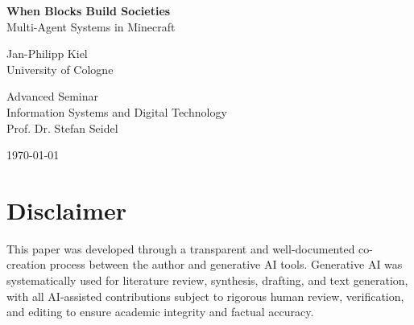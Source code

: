 \documentclass[a4paper, 12pt]{article}
\begin{document}

\begin{titlepage}
    \begin{center}
        \vspace*{\fill}
        \vspace*{-2cm}
        \large
        {\bfseries{When Blocks Build Societies}}\\
        Multi-Agent Systems in Minecraft\\

        \vspace{1cm}

        Jan-Philipp Kiel\\
        University of Cologne

        \vspace{1cm}

        Advanced Seminar\\
        Information Systems and Digital Technology\\
        Prof. Dr. Stefan Seidel

        \vspace{1cm}

        \today
        \vspace*{\fill}
    \end{center}
\end{titlepage}
\clearpage

\section*{Disclaimer}

This paper was developed through a transparent and well-documented co- \linebreak creation process between the author and generative AI tools. Generative AI was systematically used for literature review, synthesis, drafting, and text generation, with all AI-assisted contributions subject to rigorous human review, verification, and editing to ensure academic integrity and factual accuracy.
\end{document}
